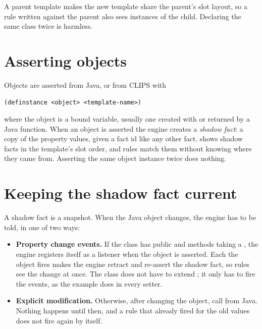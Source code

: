 A parent template makes the new template share the parent's slot layout,
so a rule written against the parent also sees instances of the child.
Declaring the same class twice is harmless.

\section{Asserting objects}

Objects are asserted from Java, or from CLIPS with

\begin{lstlisting}
(definstance <object> <template-name>)
\end{lstlisting}

where the object is a bound variable, usually one created with
 or returned by a Java function. When an
object is asserted the engine creates a \emph{shadow fact}: a copy of the
property values, given a fact id like any other fact.  shows
shadow facts in the template's slot order, and rules match them without
knowing where they came from. Asserting the same object instance twice
does nothing.

\section{Keeping the shadow fact current}

A shadow fact is a snapshot. When the Java object changes, the engine has
to be told, in one of two ways:

\begin{itemize}
\item \textbf{Property change events.} If the class has public
   and 
  methods taking a , the engine registers
  itself as a listener when the object is asserted. Each
   the object fires makes the engine retract and
  re-assert the shadow fact, so rules see the change at once. The class
  does not have to extend ; it only has to fire
  the events, as the  example does in every setter.
\item \textbf{Explicit modification.} Otherwise, after changing the
  object, call  from Java. Nothing happens
  until then, and a rule that already fired for the old values does not
  fire again by itself.
\end{itemize}

